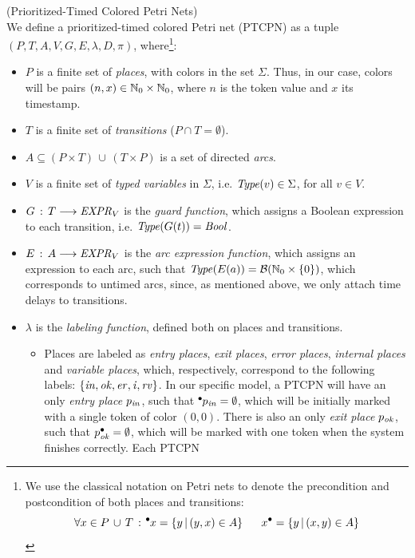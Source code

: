 \begin{definition} (Prioritized-Timed Colored Petri Nets)\\
We define a prioritized-timed colored Petri net (PTCPN)
as a tuple \linebreak 
$(P,T,A,V,G,E,\lambda,D,\pi)$, where\footnote{
We use the classical notation on Petri nets to denote the
precondition and postcondition of both places and transitions:
%
\[ \forall x \in P\,\cup\,T\,:\,
\hspace*{-0.4em}~^{\bullet} \hspace*{-0.05em}x = \{ y \,|\, (y,x) \in A\}~~~~~
   x^{\bullet} = \{ y \,|\, (x,y) \in A\}
\]
}:
%
\begin{itemize}
\item $P$ is a finite set of {\em places}, with colors
in the set $\Sigma$. Thus, in our case, colors 
will be pairs $(n,x)\in \mathbb{N}_{0} \times \mathbb{N}_{0}$, where $n$ is
the token value and $x$ its timestamp.
%
\item $T$ is a finite set of {\em transitions} ($P\cap T = \emptyset$).
%
\item $A \subseteq (P\times T)\,\cup\,(T \times P)$ is a
set of directed {\em arcs}.
%
%
\item $V$ is a finite set of {\em typed variables} in $\Sigma$, 
i.e. ${\it Type}(v) \in \Sigma$, for all $v \in V$.
%
%
\item $G\,:\, T \longrightarrow {\it EXPR}_V$ is the
{\em guard function}, which assigns a Boolean
expression
to each transition, i.e. ${\it Type}(G(t))={\it Bool}$. 
%
\item $E\,:\, A \longrightarrow {\it EXPR}_V$ is the
{\em arc expression function}, which assigns an expression
to each arc, such that ${\it Type}(E(a)) = {\cal B}(\mathbb{N}_{0} \times \{0\})$,
which corresponds to untimed arcs, since, as mentioned above,
we only attach time delays to transitions.
%
%
\item $\lambda$ is the {\em labeling function}, defined
both on places and transitions.
%
\begin{itemize}
\item Places are labeled as
{\em entry places}, {\em exit places}, {\em error places},
{\em internal places} and {\em variable places},
which, respectively, correspond to the following labels:
$\{{\it in, ok, er, i, rv}\}$. In our specific model, a 
PTCPN will have an only {\em entry place} $p_{\it in}$, 
such that $\hspace*{-0.4em}~^{\bullet} \hspace*{-0.05em}p_{\it in} = \emptyset$,
which will be
initially marked with a single token of color $(0,0)$. 
There is also
an only {\em exit place} $p_{\it ok}$, such that
$p^{\bullet}_{\it ok}=\emptyset$, which will be marked with 
one token when the system finishes correctly. Each PTCPN

\end{itemize}
\end{itemize}
\end{definition}
